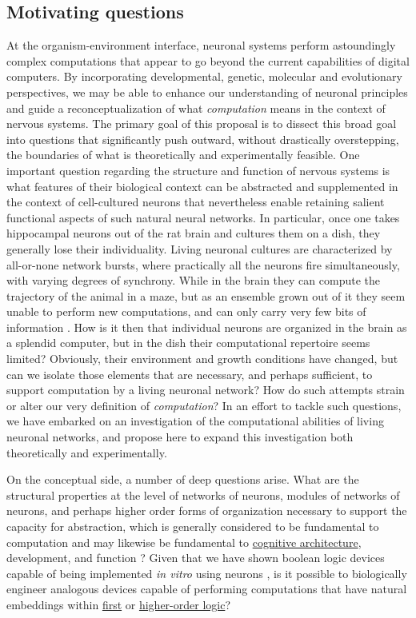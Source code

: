 \subsection{Motivating questions}
At the organism-environment interface, neuronal systems perform astoundingly complex computations that appear to go beyond the current capabilities of digital computers. By incorporating developmental, genetic, molecular and evolutionary perspectives, we may be able to enhance our understanding of neuronal principles and guide a reconceptualization of what {\it computation} means in the context of nervous systems. The primary goal of this proposal is to dissect this broad goal into questions that significantly push outward, without drastically overstepping, the boundaries of what is theoretically and experimentally feasible. One important question regarding the structure and function of nervous systems is what features of their biological context can be abstracted and supplemented in the context of cell-cultured neurons that nevertheless enable retaining salient functional aspects of such natural neural networks. In particular, once one takes hippocampal neurons out of the rat brain and cultures them on a dish, they generally lose their individuality. Living neuronal cultures are characterized by all-or-none network bursts, where practically all the neurons fire simultaneously, with varying degrees of synchrony. While in the brain they can compute the trajectory of the animal in a maze, but as an ensemble grown out of it they seem unable to perform new computations, and can only carry very few bits of information \cite{Feinerman2006}. How is it then that individual neurons are organized in the brain as a splendid computer, but in the dish their computational repertoire seems limited? Obviously, their environment and growth conditions have changed, but can we isolate those elements that are necessary, and perhaps sufficient, to support computation by a living neuronal network? How do such attempts strain or alter our very definition of {\it computation}? In an effort to tackle such questions, we have embarked on an investigation of the computational abilities of living neuronal networks, and propose here to expand this investigation both theoretically and experimentally.

On the conceptual side, a number of deep questions arise. What are the structural properties at the level of networks of neurons,
modules of networks of neurons, and perhaps higher order forms of
organization necessary to support the capacity for
abstraction, which is generally considered to be fundamental to computation \cite{Abelson1996} and may likewise be fundamental to
\href{http://en.wikipedia.org/wiki/Cognitive\_architecture}{cognitive
architecture}, development, and function \cite{Tenenbaum2011}? Given that we have shown boolean
logic devices capable of being implemented {\em in vitro} using
neurons \cite{Feinerman2008}, is it possible to biologically engineer analogous
devices capable of performing computations that have natural embeddings
within \href{http://en.wikipedia.org/wiki/First-order\_logic}{first} or
\href{http://en.wikipedia.org/wiki/Higher\_order\_logic}{higher-order
logic}?

